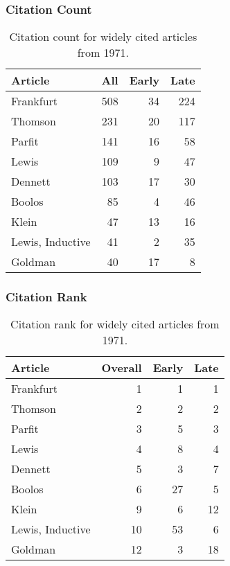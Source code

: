 \documentclass[
  10pt,
  letterpaper,
  DIV=11,
  numbers=noendperiod,
  twoside]{scrartcl}
\begin{document}
\subsubsection*{Citation Count}\label{sec-count-1971}

\begin{longtable}[]{@{}lrrr@{}}

\caption{\label{tbl-citation-count-1971}Citation count for widely cited
articles from 1971.}

\tabularnewline

\toprule\noalign{}
Article & All & Early & Late \\
\midrule\noalign{}
\endhead
\bottomrule\noalign{}
\endlastfoot
Frankfurt & 508 & 34 & 224 \\
Thomson & 231 & 20 & 117 \\
Parfit & 141 & 16 & 58 \\
Lewis & 109 & 9 & 47 \\
Dennett & 103 & 17 & 30 \\
Boolos & 85 & 4 & 46 \\
Klein & 47 & 13 & 16 \\
Lewis, Inductive & 41 & 2 & 35 \\
Goldman & 40 & 17 & 8 \\

\end{longtable}

\subsubsection*{Citation Rank}\label{sec-rank-1971}

\begin{longtable}[]{@{}lrrr@{}}

\caption{\label{tbl-citation-rank-1971}Citation rank for widely cited
articles from 1971.}

\tabularnewline

\toprule\noalign{}
Article & Overall & Early & Late \\
\midrule\noalign{}
\endhead
\bottomrule\noalign{}
\endlastfoot
Frankfurt & 1 & 1 & 1 \\
Thomson & 2 & 2 & 2 \\
Parfit & 3 & 5 & 3 \\
Lewis & 4 & 8 & 4 \\
Dennett & 5 & 3 & 7 \\
Boolos & 6 & 27 & 5 \\
Klein & 9 & 6 & 12 \\
Lewis, Inductive & 10 & 53 & 6 \\
Goldman & 12 & 3 & 18 \\

\end{longtable}
\end{document}
